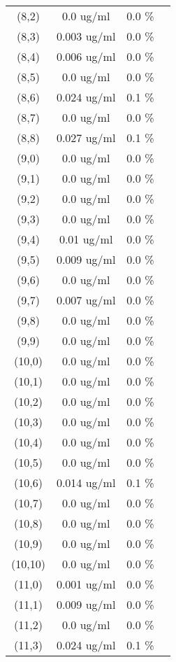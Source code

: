 \documentclass{article}
\begin{document}
\begin{tabular}{c c c c}
(8,2)&        0.0 ug/ml        &0.0 \%\\
(8,3)&        0.003 ug/ml        &0.0 \%\\
(8,4)&        0.006 ug/ml        &0.0 \%\\
(8,5)&        0.0 ug/ml        &0.0 \%\\
(8,6)&        0.024 ug/ml        &0.1 \%\\
(8,7)&        0.0 ug/ml        &0.0 \%\\
(8,8)&        0.027 ug/ml        &0.1 \%\\
(9,0)&        0.0 ug/ml        &0.0 \%\\
(9,1)&        0.0 ug/ml        &0.0 \%\\
(9,2)&        0.0 ug/ml        &0.0 \%\\
(9,3)&        0.0 ug/ml        &0.0 \%\\
(9,4)&        0.01 ug/ml        &0.0 \%\\
(9,5)&        0.009 ug/ml        &0.0 \%\\
(9,6)&        0.0 ug/ml        &0.0 \%\\
(9,7)&        0.007 ug/ml        &0.0 \%\\
(9,8)&        0.0 ug/ml        &0.0 \%\\
(9,9)&        0.0 ug/ml        &0.0 \%\\
(10,0)&        0.0 ug/ml        &0.0 \%\\
(10,1)&        0.0 ug/ml        &0.0 \%\\
(10,2)&        0.0 ug/ml        &0.0 \%\\
(10,3)&        0.0 ug/ml        &0.0 \%\\
(10,4)&        0.0 ug/ml        &0.0 \%\\
(10,5)&        0.0 ug/ml        &0.0 \%\\
(10,6)&        0.014 ug/ml        &0.1 \%\\
(10,7)&        0.0 ug/ml        &0.0 \%\\
(10,8)&        0.0 ug/ml        &0.0 \%\\
(10,9)&        0.0 ug/ml        &0.0 \%\\
(10,10)&        0.0 ug/ml        &0.0 \%\\
(11,0)&        0.001 ug/ml        &0.0 \%\\
(11,1)&        0.009 ug/ml        &0.0 \%\\
(11,2)&        0.0 ug/ml        &0.0 \%\\
(11,3)&        0.024 ug/ml        &0.1 \%\\

\end{tabular}
\end{document}
